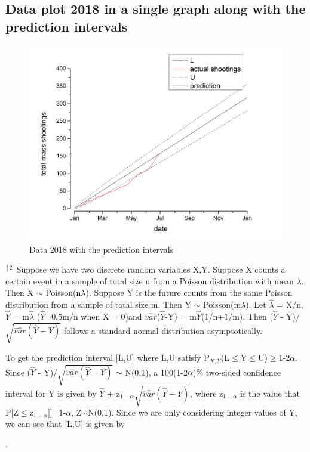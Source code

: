 \documentclass[12pt]{article}
\begin{document}
\subsection{Data plot 2018 in a single graph along with the prediction intervals}
\begin{figure}[H]
\centering
\includegraphics[scale=0.5]{Q9.jpg}
\caption{Data 2018 with the prediction intervals}
\end{figure}
$^{[2]}$Suppose we have two discrete random variables X,Y. Suppose X counts a certain event in a sample of total size n from a Poisson distribution with mean $\lambda$. Then X $\sim$ Poisson(n$\lambda$). Suppose Y is the future counts from the same Poisson distribution from a sample of total size m. Then Y $\sim$ Poisson(m$\lambda$). Let $\widehat{\lambda}$ = X/n, $\widehat{Y}$ = m$\widehat{\lambda}$ ($\widehat{Y}$=0.5m/n when X = 0)and $\widehat{var}$($\widehat{Y}$-Y) = m$\widehat{Y}$(1/n+1/m). Then ($\widehat{Y}$ - Y)/$\sqrt{\widehat{var}(\widehat{Y}-Y)}$ follows a standard normal distribution asymptotically.\par

To get the prediction interval [L,U] where L,U satisfy P$_{X,Y}$(L$\le$Y$\le$U)$\ge$1-2$\alpha$. Since ($\widehat{Y}$ - Y)/$\sqrt{\widehat{var}(\widehat{Y}-Y)}$ $\sim$ N(0,1), a 100(1-2$\alpha$)$\%$ two-sided confidence interval for Y is given by $\widehat{Y}$ $\pm$ z$_{1-\alpha}\sqrt{\widehat{var}(\widehat{Y}-Y)}$, where z$_{1-\alpha}$ is the value that P[Z$\le$z$_{1-\alpha}]$]=1-$\alpha$, Z$\sim$N(0,1). Since we are only considering integer values of Y, we can see that [L,U] is given by \par [$\lfloor$$\widehat{Y}$- z$_{1-\alpha}\sqrt{\widehat{var}(\widehat{Y}-Y)}$$\rfloor$,$\lceil$$\widehat{Y}$+z$_{1-\alpha}\sqrt{\widehat{var}(\widehat{Y}-Y)}$$\rceil$].
\end{document}
